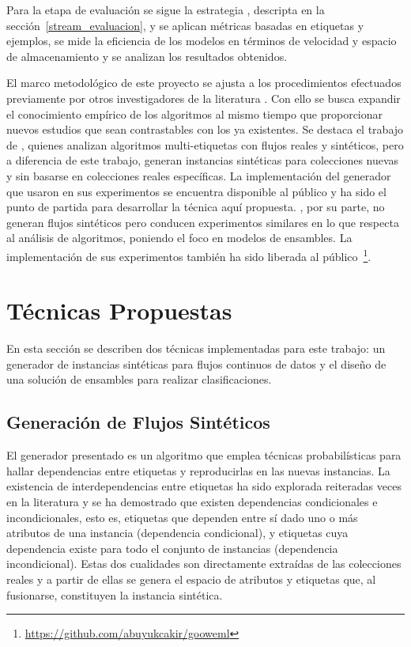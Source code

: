 Para la etapa de evaluación se sigue la estrategia
, descripta en la
sección~\ref{stream_evaluacion}, y se aplican métricas basadas en etiquetas y
ejemplos, se mide la eficiencia de los modelos en términos de velocidad y
espacio de almacenamiento y se analizan los resultados obtenidos.

El marco metodológico de este proyecto se ajusta a los procedimientos efectuados
previamente por otros investigadores de la literatura
\cite{osojnik_multi-label_2017, sousa_multi-label_2018, buyukcakir_novel_2018,
	zheng_survey_2020, read_scalable_2012}. Con ello se busca expandir el
conocimiento empírico de los algoritmos al mismo tiempo que proporcionar nuevos
estudios que sean contrastables con los ya existentes.  Se destaca el trabajo de
\citeauthor{read_scalable_2012} \cite{read_scalable_2012}, quienes analizan
algoritmos multi-etiquetas con flujos reales y sintéticos, pero a diferencia de
este trabajo, generan instancias sintéticas para colecciones nuevas y sin
basarse en colecciones reales específicas. La implementación del generador que
usaron en sus experimentos se encuentra disponible al público
\cite{read_moa_2012} y ha sido el punto de partida para desarrollar la técnica
aquí propuesta.  \citeauthor{buyukcakir_novel_2018}, por su parte, no generan
flujos sintéticos pero conducen experimentos similares en lo que respecta al
análisis de algoritmos, poniendo el foco en modelos de ensambles.  La
implementación de sus experimentos también ha sido liberada al
público~\footnote{\url{https://github.com/abuyukcakir/gooweml}}.

\section{Técnicas Propuestas}

En esta sección se describen dos técnicas implementadas para este trabajo: un
generador de instancias sintéticas para flujos continuos de datos y el diseño de
una solución de ensambles para realizar clasificaciones.

\subsection{Generación de Flujos Sintéticos}
\label{generacion_flujos_sinteticos}

El generador presentado es un algoritmo que emplea técnicas probabilísticas para
hallar dependencias entre etiquetas y reproducirlas en las nuevas instancias. La
existencia de interdependencias entre etiquetas ha sido explorada reiteradas
veces en la literatura \cite{tsoumakas_multi-label_2007, read_multi-label_2008}
y se ha demostrado que existen dependencias condicionales e incondicionales,
esto es, etiquetas que dependen entre sí dado uno o más atributos de una
instancia (dependencia condicional), y etiquetas cuya dependencia existe para
todo el conjunto de instancias (dependencia incondicional). Estas dos cualidades
son directamente extraídas de las colecciones reales y a partir de ellas se
genera el espacio de atributos y etiquetas que, al fusionarse, constituyen la
instancia sintética.

